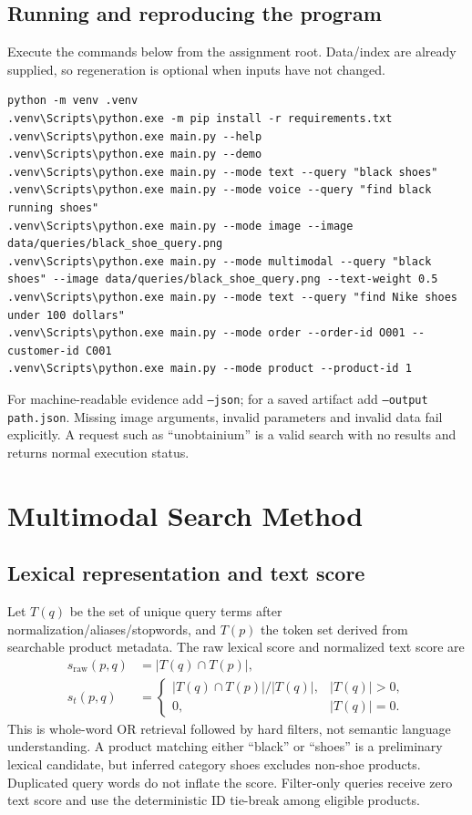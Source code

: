 \documentclass[11pt,a4paper]{article}
\begin{document}
\subsection{Running and reproducing the program}
Execute the commands below from the assignment root. Data/index are already supplied, so regeneration is optional when inputs have not changed.
\begin{lstlisting}[language={},caption={Runtime setup and supported interactions}]
python -m venv .venv
.venv\Scripts\python.exe -m pip install -r requirements.txt
.venv\Scripts\python.exe main.py --help
.venv\Scripts\python.exe main.py --demo
.venv\Scripts\python.exe main.py --mode text --query "black shoes"
.venv\Scripts\python.exe main.py --mode voice --query "find black running shoes"
.venv\Scripts\python.exe main.py --mode image --image data/queries/black_shoe_query.png
.venv\Scripts\python.exe main.py --mode multimodal --query "black shoes" --image data/queries/black_shoe_query.png --text-weight 0.5
.venv\Scripts\python.exe main.py --mode text --query "find Nike shoes under 100 dollars"
.venv\Scripts\python.exe main.py --mode order --order-id O001 --customer-id C001
.venv\Scripts\python.exe main.py --mode product --product-id 1
\end{lstlisting}
For machine-readable evidence add \texttt{--json}; for a saved artifact add \texttt{--output path.json}. Missing image arguments, invalid parameters and invalid data fail explicitly. A request such as ``unobtainium'' is a valid search with no results and returns normal execution status.

\section{Multimodal Search Method}\label{sec:method}
\subsection{Lexical representation and text score}
Let $T(q)$ be the set of unique query terms after normalization/aliases/stopwords, and $T(p)$ the token set derived from searchable product metadata. The raw lexical score and normalized text score are
\begin{align}
s_{\mathrm{raw}}(p,q)&=|T(q)\cap T(p)|,\\
s_t(p,q)&=\begin{cases}|T(q)\cap T(p)|/|T(q)|,& |T(q)|>0,\\0,& |T(q)|=0.\end{cases}
\end{align}
This is whole-word OR retrieval followed by hard filters, not semantic language understanding. A product matching either ``black'' or ``shoes'' is a preliminary lexical candidate, but inferred category shoes excludes non-shoe products. Duplicated query words do not inflate the score. Filter-only queries receive zero text score and use the deterministic ID tie-break among eligible products.
\end{document}
